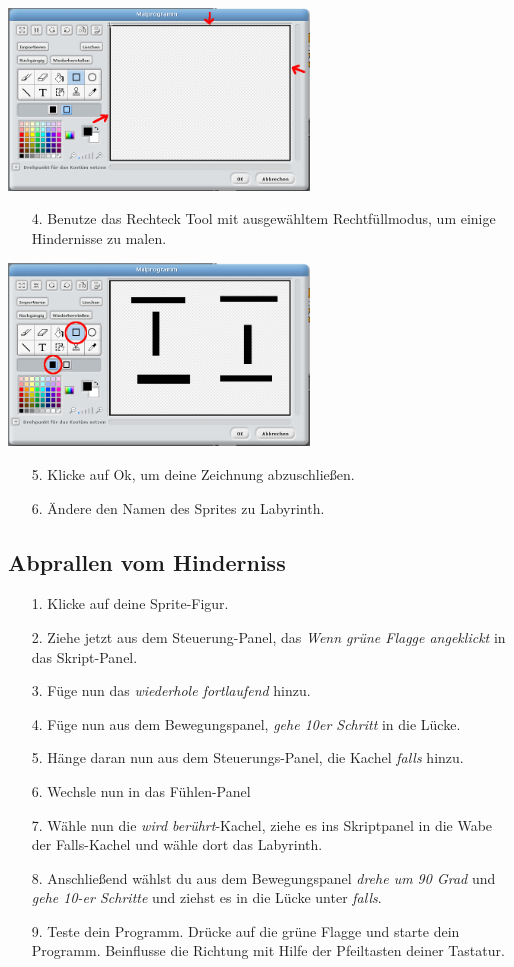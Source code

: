 \includegraphics[width=0.6\textwidth]{images/aufgabe2_rechteck_gross.png}
\begin{itemize}
\item[4.] Benutze das Rechteck Tool mit ausgewähltem Rechtfüllmodus, um einige Hindernisse zu malen.
\end{itemize}
\includegraphics[width=0.6\textwidth]{images/aufgabe2_labyrinth.png}
\begin{itemize}
\item[5.] Klicke auf Ok, um deine Zeichnung abzuschließen.
\item[6.] Ändere den Namen des Sprites zu Labyrinth.
\end{itemize}

\subsection{Abprallen vom Hinderniss}
\begin{itemize}
\item[1.] Klicke auf deine Sprite-Figur.
\item[2.] Ziehe jetzt aus dem Steuerung-Panel, das \textit{Wenn grüne Flagge angeklickt} in das Skript-Panel.
\item[3.] Füge nun das \textit{wiederhole fortlaufend} hinzu. 
\item[4.] Füge nun aus dem Bewegungspanel, \textit{gehe 10er Schritt} in die Lücke.
\item[5.] Hänge daran nun aus dem Steuerungs-Panel, die Kachel \textit{falls} hinzu.
\item[6.] Wechsle nun in das Fühlen-Panel
\item[7.] Wähle nun die \textit{wird berührt}-Kachel, ziehe es ins Skriptpanel in die Wabe der Falls-Kachel und wähle dort das Labyrinth. 
\item[8.] Anschließend wählst du aus dem Bewegungspanel \textit{drehe um 90 Grad} und \textit{gehe 10-er Schritte} und ziehst es in die Lücke unter \textit{falls}.
\item[9.] Teste dein Programm. Drücke auf die grüne Flagge und starte dein Programm. Beinflusse die Richtung mit Hilfe der Pfeiltasten deiner Tastatur.
\end{itemize}
